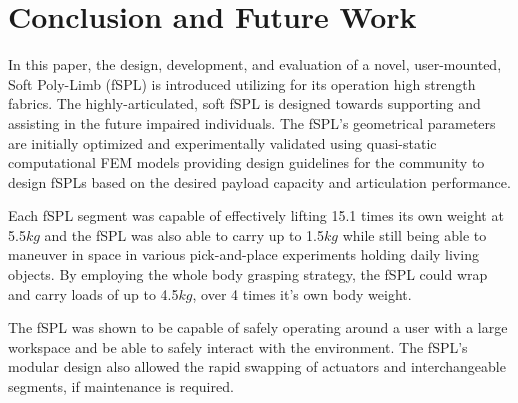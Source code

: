 \documentclass[letterpaper, 10 pt, conference]{ieeeconf}  %
\begin{document}



\section{Conclusion and Future Work}

In this paper, the design, development, and evaluation of a novel, user-mounted, Soft Poly-Limb (fSPL) is introduced utilizing for its operation high strength fabrics. The highly-articulated, soft fSPL is designed towards supporting and assisting in the future impaired individuals. The fSPL’s geometrical parameters are initially optimized and experimentally validated using quasi-static computational FEM models providing design guidelines for the community to design fSPLs based on the desired payload capacity and articulation performance.

Each fSPL segment was capable of effectively lifting 15.1 times its own weight at 5.5$kg$ and the fSPL was also able to carry up to 1.5$kg$ while still being able to maneuver in space in various pick-and-place experiments holding daily living objects. By employing the whole body grasping strategy, the fSPL could wrap and carry loads of up to 4.5$kg$, over 4 times it’s own body weight.

The fSPL was shown to be capable of safely operating around a user with a large workspace and be able to safely interact with the environment. The fSPL’s modular design also allowed the rapid swapping of actuators and interchangeable segments, if maintenance is required. 
\end{document}
